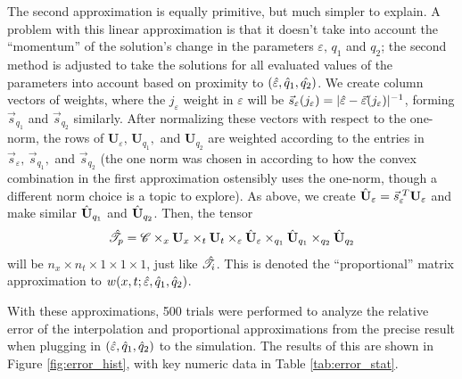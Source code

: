 \documentclass[12pt]{article}
\newcommand{\eps}{\varepsilon}
\begin{document}
    The second approximation is equally primitive, but much simpler to explain. A problem with this linear approximation is that it doesn't take into account the ``momentum'' of the solution's change in the parameters $\eps,\,q_1$ and $q_2$; the second method is adjusted to take the solutions for all evaluated values of the parameters into account based on proximity to $(\Hat{\eps},\Hat{q}_1,\Hat{q_2})$. We create column vectors of weights, where the $j_\eps$ weight in $\eps$ will be $\vec{s}_\eps(j_\eps) = |\Hat{\eps}-\vec{\eps}(j_\eps)|^{-1}$, forming $\vec{s}_{q_1}$ and $\vec{s}_{q_2}$ similarly. After normalizing these vectors with respect to the one-norm, the rows of $\mathbf{U}_\eps,\,\mathbf{U}_{q_1},$ and $\mathbf{U}_{q_2}$ are weighted according to the entries in $\vec{s}_\eps,\,\vec{s}_{q_1},$ and $\vec{s}_{q_2}$ (the one norm was chosen in according to how the convex combination in the first approximation ostensibly uses the one-norm, though a different norm choice is a topic to explore). As above, we create $\Hat{\mathbf{U}}_\eps = \vec{s}_\eps^{\;T}\mathbf{U}_\eps$ and make similar $\Hat{\mathbf{U}}_{q_1}$ and $\Hat{\mathbf{U}}_{q_2}$. Then, the tensor
        \[\Hat{\mathscr{T}}_p = \mathscr{C}\times_x \mathbf{U}_x\times_t\mathbf{U}_t\times_\eps\Hat{\mathbf{U}}_\eps\times_{q_1}\Hat{\mathbf{U}}_{q_1}\times_{q_2}\Hat{\mathbf{U}}_{q_2}\]
    will be $n_x\times n_t\times 1\times 1\times 1$, just like $\Hat{\mathscr{T}}_i$. This is denoted the ``proportional'' matrix approximation to $w(x,t;\Hat{\eps},\Hat{q}_1,\Hat{q}_2)$.

    With these approximations, 500 trials were performed to analyze the relative error of the interpolation and proportional approximations from the precise result when plugging in $(\Hat{\eps},\Hat{q}_1,\Hat{q}_2)$ to the simulation. The results of this are shown in Figure \ref{fig:error_hist}, with key numeric data in Table \ref{tab:error_stat}.
\end{document}

